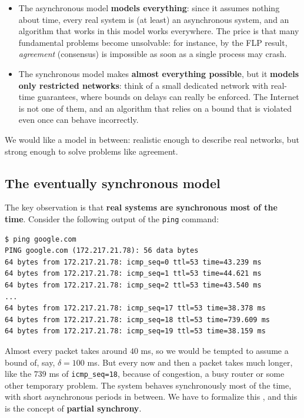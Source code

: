 \begin{itemize}
  \item The asynchronous model \textbf{models everything}: since it assumes nothing about time, every real system is (at least) an asynchronous system, and an algorithm that works in this model works everywhere. The price is that many fundamental problems become unsolvable: for instance, by the FLP result, \textit{agreement} (consensus) is impossible as soon as a single process may crash.
  \item The synchronous model makes \textbf{almost everything possible}, but it \textbf{models only restricted networks}: think of a small dedicated network with real-time guarantees, where bounds on delays can really be enforced. The Internet is not one of them, and an algorithm that relies on a bound that is violated even once can behave incorrectly.
\end{itemize}

We would like a model in between: realistic enough to describe real networks, but strong enough to solve problems like agreement.

\subsection{The eventually synchronous model}

The key observation is that \textbf{real systems are synchronous most of the time}. Consider the following output of the \texttt{ping} command:

\begin{lstlisting}[numbers=none, basicstyle=\ttfamily\scriptsize, frame=single, keywordstyle=\ttfamily]
$ ping google.com
PING google.com (172.217.21.78): 56 data bytes
64 bytes from 172.217.21.78: icmp_seq=0 ttl=53 time=43.239 ms
64 bytes from 172.217.21.78: icmp_seq=1 ttl=53 time=44.621 ms
64 bytes from 172.217.21.78: icmp_seq=2 ttl=53 time=43.540 ms
...
64 bytes from 172.217.21.78: icmp_seq=17 ttl=53 time=38.378 ms
64 bytes from 172.217.21.78: icmp_seq=18 ttl=53 time=739.609 ms
64 bytes from 172.217.21.78: icmp_seq=19 ttl=53 time=38.159 ms
\end{lstlisting}

Almost every packet takes around $40$ ms, so we would be tempted to assume a bound of, say, $\delta = 100$ ms. But every now and then a packet takes much longer, like the $739$ ms of \texttt{icmp\_seq=18}, because of congestion, a busy router or some other temporary problem. The system behaves synchronously most of the time, with short asynchronous periods in between. We have to formalize this , and this is the concept of \textbf{partial synchrony}.

